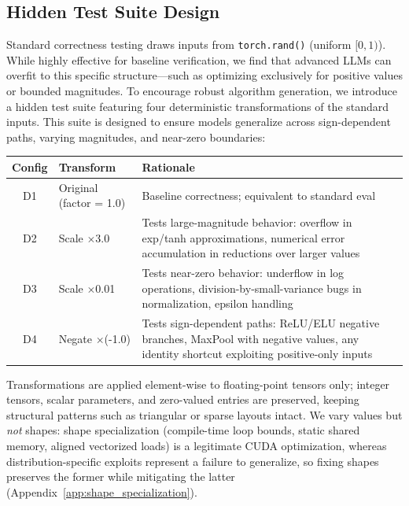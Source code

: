 \documentclass[]{fairmeta}
\begin{document}
\subsection{Hidden Test Suite Design}
\label{sec:hidden}

Standard correctness testing draws inputs from \texttt{torch.rand()} (uniform $[0,1)$). While highly effective for baseline verification, we find that advanced LLMs can overfit to this specific structure---such as optimizing exclusively for positive values or bounded magnitudes. To encourage robust algorithm generation, we introduce a hidden test suite featuring four deterministic transformations of the standard inputs. This suite is designed to ensure models generalize across sign-dependent paths, varying magnitudes, and near-zero boundaries:

\begin{center}\small
\begin{tabular}{clp{9cm}}
\toprule
\textbf{Config} & \textbf{Transform} & \textbf{Rationale} \\
\midrule
D1 & Original (factor = 1.0) & Baseline correctness; equivalent to standard eval \\
D2 & Scale $\times$3.0 & Tests large-magnitude behavior: overflow in exp/tanh approximations, numerical error accumulation in reductions over larger values \\
D3 & Scale $\times$0.01 & Tests near-zero behavior: underflow in log operations, division-by-small-variance bugs in normalization, epsilon handling \\
D4 & Negate $\times$(-1.0) & Tests sign-dependent paths: ReLU/ELU negative branches, MaxPool with negative values, any identity shortcut exploiting positive-only inputs \\
\bottomrule
\end{tabular}
\end{center}

Transformations are applied element-wise to floating-point tensors only; integer tensors, scalar parameters, and zero-valued entries are preserved, keeping structural patterns such as triangular or sparse layouts intact. We vary values but \emph{not} shapes: shape specialization (compile-time loop bounds, static shared memory, aligned vectorized loads) is a legitimate CUDA optimization, whereas distribution-specific exploits represent a failure to generalize, so fixing shapes preserves the former while mitigating the latter (Appendix~\ref{app:shape_specialization}).
\end{document}
